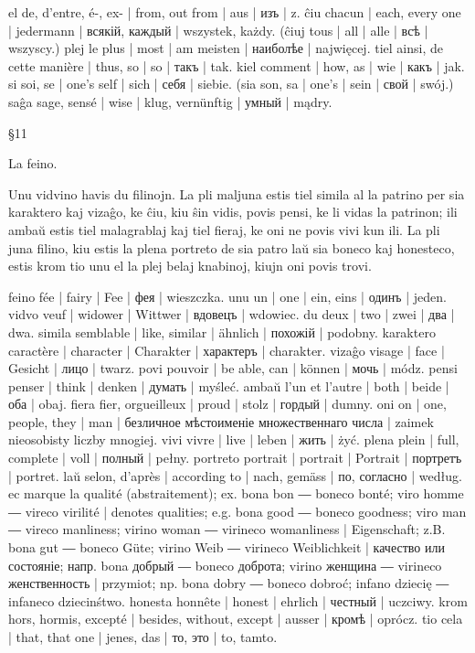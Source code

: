el de, d’entre, é-, ex- | from, out from | aus | изъ | z.
ĉiu chacun | each, every one | jedermann | всякій, каждый | wszystek, każdy.
(ĉiuj tous | all | alle | всѣ | wszyscy.)
plej le plus | most | am meisten | наиболѣе | najwięcej.
tiel ainsi, de cette manière | thus, so | so | такъ | tak.
kiel comment | how, as | wie | какъ | jak.
si soi, se | one’s self | sich | себя | siebie.
(sia son, sa | one’s | sein | свой | swój.)
saĝa sage, sensé | wise | klug, vernünftig | умный | mądry.

§11

La feino.

Unu vidvino havis du filinojn. La pli maljuna estis tiel simila al la patrino per sia karaktero kaj vizaĝo, ke ĉiu, kiu ŝin vidis, povis pensi, ke li vidas la patrinon; ili ambaŭ estis tiel malagrablaj kaj tiel fieraj, ke oni ne povis vivi kun ili. La pli juna filino, kiu estis la plena portreto de sia patro laŭ sia boneco kaj honesteco, estis krom tio unu el la plej belaj knabinoj, kiujn oni povis trovi.

feino fée | fairy | Fee | фея | wieszczka.
unu un | one | ein, eins | одинъ | jeden.
vidvo veuf | widower | Wittwer | вдовецъ | wdowiec.
du deux | two | zwei | два | dwa.
simila semblable | like, similar | ähnlich | похожій | podobny.
karaktero caractère | character | Charakter | характеръ | charakter.
vizaĝo visage | face | Gesicht | лицо | twarz.
povi pouvoir | be able, can | können | мочь | módz.
pensi penser | think | denken | думать | myśleć.
ambaŭ l’un et l’autre | both | beide | оба | obaj.
fiera fier, orgueilleux | proud | stolz | гордый | dumny.
oni on | one, people, they | man | безличное мѣстоименіе множественнаго числа | zaimek nieosobisty liczby mnogiej.
vivi vivre | live | leben | жить | żyć.
plena plein | full, complete | voll | полный | pełny.
portreto portrait | portrait | Portrait | портретъ | portret.
laŭ selon, d’après | according to | nach, gemäss | по, согласно | według.
ec marque la qualité (abstraitement); ex. bona bon ― boneco bonté; viro homme ― vireco virilité | denotes qualities; e.g. bona good ― boneco goodness; viro man ― vireco manliness; virino woman ― virineco womanliness | Eigenschaft; z.B. bona gut ― boneco Güte; virino Weib ― virineco Weiblichkeit | качество или состояніе; напр. bona добрый ― boneco доброта; virino женщина ― virineco женственность | przymiot; np. bona dobry ― boneco dobroć; infano dziecię ― infaneco dziecinśtwo.
honesta honnête | honest | ehrlich | честный | uczciwy.
krom hors, hormis, excepté | besides, without, except | ausser | кромѣ | oprócz.
tio cela | that, that one | jenes, das | то, это | to, tamto.

